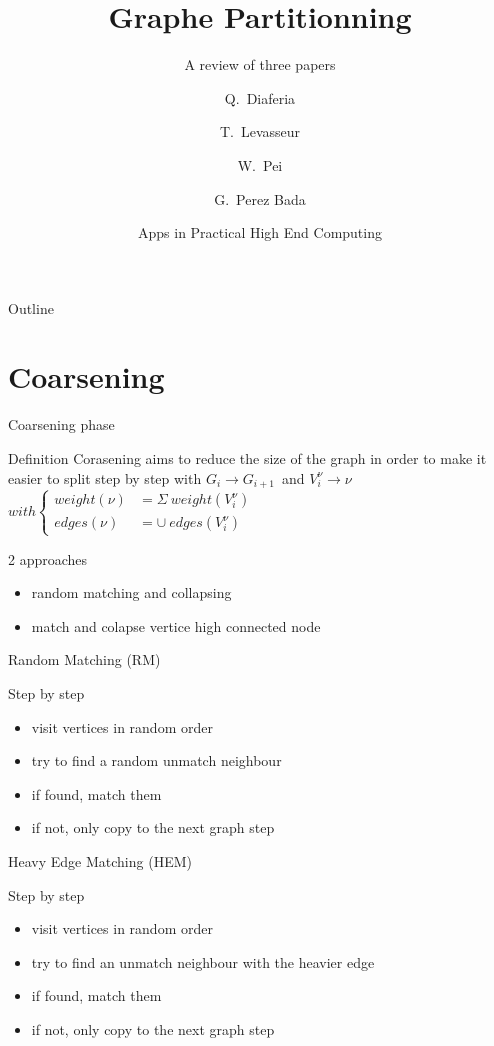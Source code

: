 \documentclass{beamer}
\title{Graphe Partitionning}
\subtitle{A review of three papers}
\author{Q.~Diaferia \and T.~Levasseur \and W.~Pei \and G.~Perez Bada}
\institute[Cranfield University] %
{
  School of Aerospace\\
  Cranfield University
}
\date{Apps in Practical High End Computing}
\begin{document}
\begin{frame}
  \titlepage
\end{frame}

\begin{frame}{Outline}
  \tableofcontents
\end{frame}

\section{Coarsening}


\begin{frame}{Coarsening phase}
	
	\begin{block}{Definition}
	Corasening aims to reduce the size of the graph in order to make it easier to split step by step with
	\(G_i \to G_{i+1}\)~and \(V^\nu_i \to \nu\) 
	\( with \begin{cases}
		weight(\nu)& = \Sigma ~ weight(V^\nu_i) \\
		edges(\nu) & =  \cup ~ edges(V^\nu_i)
	\end{cases}
	\)
	\end{block}
	\begin{block}{2 approaches}
		 \begin{itemize}
			\item random matching and collapsing
			\item match and colapse vertice high connected node
		 \end{itemize}
	\end{block}
\end{frame}


\begin{frame}{Random Matching (RM)}
	\begin{block}{Step by step}
		 \begin{itemize}
			\item visit vertices in random order
			\item try to find a random unmatch neighbour
			\item if found, match them
			\item if not, only copy to the next graph step
		 \end{itemize}
	\end{block}
\end{frame}


\begin{frame}{Heavy Edge Matching (HEM)}
	\begin{block}{Step by step}
		 \begin{itemize}
			\item visit vertices in random order
			\item try to find an unmatch neighbour with the heavier edge
			\item if found, match them
			\item if not, only copy to the next graph step
		 \end{itemize}
	\end{block}
\end{frame}
\end{document}
